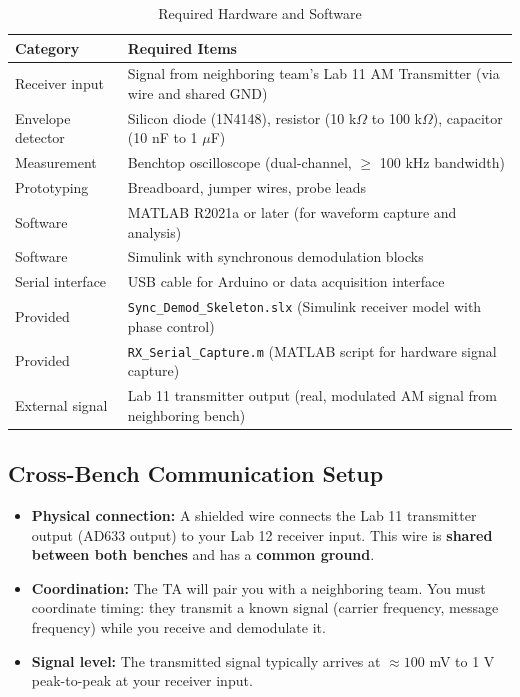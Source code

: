 \documentclass[11pt,letterpaper]{article}
\begin{document}
\begin{table}[H]
    \centering
    \caption{Required Hardware and Software}
    \label{tab:equipment}
    \begin{tabularx}{\linewidth}{l X}
    \toprule
    \textbf{Category} & \textbf{Required Items}\\
    \midrule
    Receiver input & Signal from neighboring team's Lab 11 AM Transmitter (via wire and shared GND)\\
    Envelope detector & Silicon diode (1N4148), resistor (10 k$\Omega$ to 100 k$\Omega$), capacitor (10 nF to 1 $\mu$F)\\
    Measurement & Benchtop oscilloscope (dual-channel, $\geq$ 100 kHz bandwidth)\\
    Prototyping & Breadboard, jumper wires, probe leads\\
    Software & MATLAB R2021a or later (for waveform capture and analysis)\\
    Software & Simulink with synchronous demodulation blocks\\
    Serial interface & USB cable for Arduino or data acquisition interface\\
    Provided & \texttt{Sync\_Demod\_Skeleton.slx} (Simulink receiver model with phase control)\\
    Provided & \texttt{RX\_Serial\_Capture.m} (MATLAB script for hardware signal capture)\\
    External signal & Lab 11 transmitter output (real, modulated AM signal from neighboring bench)\\
    \bottomrule
    \end{tabularx}
\end{table}

\subsection*{Cross-Bench Communication Setup}

\begin{itemize}
    \item \textbf{Physical connection:} A shielded wire connects the Lab 11 transmitter output (AD633 output) to your Lab 12 receiver input. This wire is \textbf{shared between both benches} and has a \textbf{common ground}.
    \item \textbf{Coordination:} The TA will pair you with a neighboring team. You must coordinate timing: they transmit a known signal (carrier frequency, message frequency) while you receive and demodulate it.
    \item \textbf{Signal level:} The transmitted signal typically arrives at $\approx 100$ mV to 1 V peak-to-peak at your receiver input.
\end{itemize}
\end{document}
